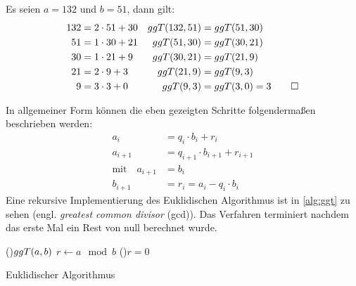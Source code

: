 \begin{example}
  Es seien $a=132$ und $b=51$, dann gilt:
  \begin{align*}
    132 & = 2 \cdot 51 + 30 & ggT(132,51) & = ggT(51,30)            \\
    51  & = 1 \cdot 30 + 21 & ggT(51,30)  & = ggT(30,21)            \\
    30  & = 1 \cdot 21 + 9  & ggT(30,21)  & = ggT(21,9)             \\
    21  & = 2 \cdot 9 + 3   & ggT(21,9)   & = ggT(9,3)              \\
    9   & = 3 \cdot 3 + 0   & ggT(9,3)    & = ggT(3,0) = 3 \qedhere
  \end{align*}
\end{example}
\noindent
In allgemeiner Form können die eben gezeigten Schritte folgendermaßen beschrieben werden:
\begin{equation}
  \label{eq:euklid}
  \begin{split}
    a_i     & = q_i \cdot b_i + r_i \\
    a_{i+1} & = q_{i+1} \cdot b_{i+1} + r_{i+1} \\
    \text{mit} \quad a_{i+1} & = b_i \\
    b_{i+1} & = r_i = a_i - q_i \cdot b_i
  \end{split}
\end{equation}
Eine rekursive Implementierung des Euklidischen Algorithmus ist in \autoref{alg:ggt}
zu sehen (engl. \textit{greatest common divisor} (gcd)).
Das Verfahren terminiert nachdem das erste Mal ein Rest von null berechnet wurde.
\begin{singlespace}
  \begin{algorithm}
    \DontPrintSemicolon
    \BlankLine
    \Fn(){$ggT(a,b)$}{
      $r \leftarrow a \mod{b}$\;
      \If(){$r = 0$}{
      }
    }
    \caption{Euklidischer Algorithmus}
    \label{alg:ggt}
  \end{algorithm}
\end{singlespace}

